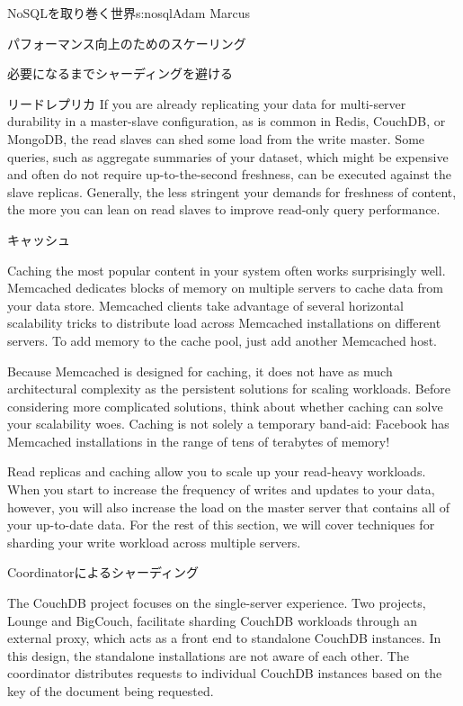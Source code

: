\begin{aosachapter}{NoSQLを取り巻く世界}{s:nosql}{Adam Marcus}
\begin{aosasect1}{パフォーマンス向上のためのスケーリング}
\begin{aosasect2}{必要になるまでシャーディングを避ける}
\begin{aosasect3}{リードレプリカ}
If you are already replicating your data for multi-server durability
in a master-slave configuration, as is common in Redis, CouchDB, or
MongoDB, the read slaves can shed some load from the write master.
Some queries, such as aggregate summaries of your dataset, which might
be expensive and often do not require up-to-the-second freshness, can
be executed against the slave replicas.  Generally, the less stringent
your demands for freshness of content, the more you can lean on read
slaves to improve read-only query performance.

\end{aosasect3}

\begin{aosasect3}{キャッシュ}

Caching the most popular content in your system often works
surprisingly well.  Memcached dedicates blocks of memory on multiple
servers to cache data from your data store.  Memcached clients take
advantage of several horizontal scalability tricks to distribute load
across Memcached installations on different servers.  To add memory to
the cache pool, just add another Memcached host.

Because Memcached is designed for caching, it does not have as much
architectural complexity as the persistent solutions for scaling
workloads.  Before considering more complicated solutions, think about
whether caching can solve your scalability woes.  Caching is not solely
a temporary band-aid: Facebook has Memcached installations in the range
of tens of terabytes of memory!

\end{aosasect3}

Read replicas and caching allow you to scale up your read-heavy
workloads.  When you start to increase the frequency of writes and
updates to your data, however, you will also increase the load on the
master server that contains all of your up-to-date data.  For the rest
of this section, we will cover techniques for sharding your write
workload across multiple servers.

\end{aosasect2}

\begin{aosasect2}{Coordinatorによるシャーディング}

The CouchDB project focuses on the single-server experience.  Two
projects, Lounge and BigCouch, facilitate sharding CouchDB workloads
through an external proxy, which acts as a front end to standalone
CouchDB instances.  In this design, the standalone installations are
not aware of each other.  The coordinator distributes requests to
individual CouchDB instances based on the key of the document being
requested.


\end{aosasect2}
\end{aosasect1}
\end{aosachapter}
